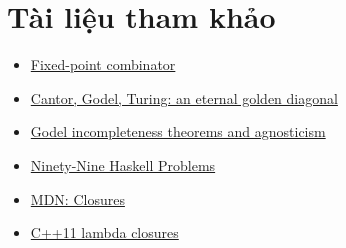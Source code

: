 \documentclass[11pt]{article}
\begin{document}
\section*{Tài liệu tham khảo}

\begin{itemize}
  \item \href{https://en.wikipedia.org/wiki/Fixed-point_combinator}{Fixed-point combinator}
  \item \href{https://mindhacks.cn/2006/10/15/cantor-godel-turing-an-eternal-golden-diagonal/}{Cantor, Godel, Turing: an eternal golden diagonal}
  \item \href{https://www.byvoid.com/blog/godel-incompleteness-theorems-agnosticism/}{Godel incompleteness theorems and agnosticism}
  \item \href{https://wiki.haskell.org/H-99:_Ninety-Nine_Haskell_Problems}{Ninety-Nine Haskell Problems}
  \item \href{https://developer.mozilla.org/en/JavaScript/Guide/Closures}{MDN: Closures}
  \item \href{https://www.cprogramming.com/c++11/c++11-lambda-closures.html}{C++11 lambda closures}
\end{itemize}
\end{document}
